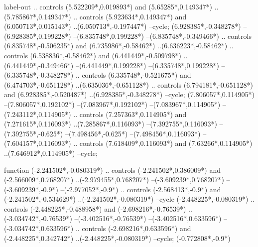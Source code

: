 {\begin{scope}[x=1mm,y=1mm,line width=\SCstroke mm,line cap=round,line join=round]
\begin{SCpart}{label-out}
.. controls ({5.522209*\SCF},{0.019893*\SCF}) and ({5.65285*\SCF},{0.149347*\SCF}) ..({5.785867*\SCF},{0.149347*\SCF})
.. controls ({5.923634*\SCF},{0.149347*\SCF}) and ({6.050713*\SCF},{0.015143*\SCF}) ..({6.050713*\SCF},{-0.197447*\SCF})
--cycle;
 ({6.928385*\SCF},{-0.348278*\SCF})
--({6.928385*\SCF},{0.199228*\SCF})
--({6.835748*\SCF},{0.199228*\SCF})
--({6.835748*\SCF},{-0.349466*\SCF})
.. controls ({6.835748*\SCF},{-0.506235*\SCF}) and ({6.735986*\SCF},{-0.58462*\SCF}) ..({6.636223*\SCF},{-0.58462*\SCF})
.. controls ({6.538836*\SCF},{-0.58462*\SCF}) and ({6.441449*\SCF},{-0.509798*\SCF}) ..({6.441449*\SCF},{-0.349466*\SCF})
--({6.441449*\SCF},{0.199228*\SCF})
--({6.335748*\SCF},{0.199228*\SCF})
--({6.335748*\SCF},{-0.348278*\SCF})
.. controls ({6.335748*\SCF},{-0.521675*\SCF}) and ({6.474703*\SCF},{-0.651128*\SCF}) ..({6.635036*\SCF},{-0.651128*\SCF})
.. controls ({6.794181*\SCF},{-0.651128*\SCF}) and ({6.928385*\SCF},{-0.520487*\SCF}) ..({6.928385*\SCF},{-0.348278*\SCF})
--cycle;
 ({7.806057*\SCF},{0.114905*\SCF})
--({7.806057*\SCF},{0.192102*\SCF})
--({7.083967*\SCF},{0.192102*\SCF})
--({7.083967*\SCF},{0.114905*\SCF})
--({7.243112*\SCF},{0.114905*\SCF})
.. controls ({7.257363*\SCF},{0.114905*\SCF}) and ({7.271615*\SCF},{0.116093*\SCF}) ..({7.285867*\SCF},{0.116093*\SCF})
--({7.392755*\SCF},{0.116093*\SCF})
--({7.392755*\SCF},{-0.625*\SCF})
--({7.498456*\SCF},{-0.625*\SCF})
--({7.498456*\SCF},{0.116093*\SCF})
--({7.604157*\SCF},{0.116093*\SCF})
.. controls ({7.618409*\SCF},{0.116093*\SCF}) and ({7.63266*\SCF},{0.114905*\SCF}) ..({7.646912*\SCF},{0.114905*\SCF})
--cycle;
\end{SCpart}
\begin{SCpart}{function}
 ({-2.241502*\SCF},{-0.080319*\SCF})
.. controls ({-2.241502*\SCF},{0.386009*\SCF}) and ({-2.566009*\SCF},{0.768207*\SCF}) ..({-2.979455*\SCF},{0.768207*\SCF})
--({-3.609239*\SCF},{0.768207*\SCF})
--({-3.609239*\SCF},{-0.9*\SCF})
--({-2.977052*\SCF},{-0.9*\SCF})
.. controls ({-2.568413*\SCF},{-0.9*\SCF}) and ({-2.241502*\SCF},{-0.534629*\SCF}) ..({-2.241502*\SCF},{-0.080319*\SCF})
--cycle
({-2.448225*\SCF},{-0.080319*\SCF})
.. controls ({-2.448225*\SCF},{-0.488958*\SCF}) and ({-2.698216*\SCF},{-0.76539*\SCF}) ..({-3.034742*\SCF},{-0.76539*\SCF})
--({-3.402516*\SCF},{-0.76539*\SCF})
--({-3.402516*\SCF},{0.633596*\SCF})
--({-3.034742*\SCF},{0.633596*\SCF})
.. controls ({-2.698216*\SCF},{0.633596*\SCF}) and ({-2.448225*\SCF},{0.342742*\SCF}) ..({-2.448225*\SCF},{-0.080319*\SCF})
--cycle;
 ({-0.772808*\SCF},{-0.9*\SCF})

\end{SCpart}
\end{scope}}
